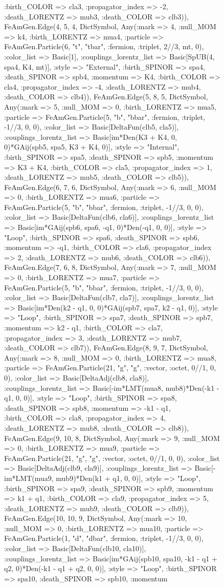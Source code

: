 \documentclass{revtex4}
\begin{document}
\begin{figure}[!htb]
\begin{center}
{:birth_COLOR => cla3, :propagator_index => -2, :death_LORENTZ => mub3, :death_COLOR => clb3)), FeAmGen.Edge(4, 5, 4, Dict{Symbol, Any}(:mark => 4, :null_MOM => k4, :birth_LORENTZ => mua4, :particle => FeAmGen.Particle(6, "t", "tbar", :fermion, :triplet, 2//3, mt, 0), :color_list => Basic[1], :couplings_lorentz_list => Basic[SpUB(4, spa4, K4, mt)], :style => "External", :birth_SPINOR => spa4, :death_SPINOR => spb4, :momentum => K4, :birth_COLOR => cla4, :propagator_index => -4, :death_LORENTZ => mub4, :death_COLOR => clb4)), FeAmGen.Edge(5, 8, 5, Dict{Symbol, Any}(:mark => 5, :null_MOM => 0, :birth_LORENTZ => mua5, :particle => FeAmGen.Particle(5, "b", "bbar", :fermion, :triplet, -1//3, 0, 0), :color_list => Basic[DeltaFun(clb5, cla5)], :couplings_lorentz_list => Basic[im*Den(K3 + K4, 0, 0)*GAij(spb5, spa5, K3 + K4, 0)], :style => "Internal", :birth_SPINOR => spa5, :death_SPINOR => spb5, :momentum => K3 + K4, :birth_COLOR => cla5, :propagator_index => 1, :death_LORENTZ => mub5, :death_COLOR => clb5)), FeAmGen.Edge(6, 7, 6, Dict{Symbol, Any}(:mark => 6, :null_MOM => 0, :birth_LORENTZ => mua6, :particle => FeAmGen.Particle(5, "b", "bbar", :fermion, :triplet, -1//3, 0, 0), :color_list => Basic[DeltaFun(clb6, cla6)], :couplings_lorentz_list => Basic[im*GAij(spb6, spa6, -q1, 0)*Den(-q1, 0, 0)], :style => "Loop", :birth_SPINOR => spa6, :death_SPINOR => spb6, :momentum => -q1, :birth_COLOR => cla6, :propagator_index => 2, :death_LORENTZ => mub6, :death_COLOR => clb6)), FeAmGen.Edge(7, 6, 8, Dict{Symbol, Any}(:mark => 7, :null_MOM => 0, :birth_LORENTZ => mua7, :particle => FeAmGen.Particle(5, "b", "bbar", :fermion, :triplet, -1//3, 0, 0), :color_list => Basic[DeltaFun(clb7, cla7)], :couplings_lorentz_list => Basic[im*Den(k2 - q1, 0, 0)*GAij(spb7, spa7, k2 - q1, 0)], :style => "Loop", :birth_SPINOR => spa7, :death_SPINOR => spb7, :momentum => k2 - q1, :birth_COLOR => cla7, :propagator_index => 3, :death_LORENTZ => mub7, :death_COLOR => clb7)), FeAmGen.Edge(8, 9, 7, Dict{Symbol, Any}(:mark => 8, :null_MOM => 0, :birth_LORENTZ => mua8, :particle => FeAmGen.Particle(21, "g", "g", :vector, :octet, 0//1, 0, 0), :color_list => Basic[DeltaAdj(clb8, cla8)], :couplings_lorentz_list => Basic[-im*LMT(mua8, mub8)*Den(-k1 - q1, 0, 0)], :style => "Loop", :birth_SPINOR => spa8, :death_SPINOR => spb8, :momentum => -k1 - q1, :birth_COLOR => cla8, :propagator_index => 4, :death_LORENTZ => mub8, :death_COLOR => clb8)), FeAmGen.Edge(9, 10, 8, Dict{Symbol, Any}(:mark => 9, :null_MOM => 0, :birth_LORENTZ => mua9, :particle => FeAmGen.Particle(21, "g", "g", :vector, :octet, 0//1, 0, 0), :color_list => Basic[DeltaAdj(clb9, cla9)], :couplings_lorentz_list => Basic[-im*LMT(mua9, mub9)*Den(k1 + q1, 0, 0)], :style => "Loop", :birth_SPINOR => spa9, :death_SPINOR => spb9, :momentum => k1 + q1, :birth_COLOR => cla9, :propagator_index => 5, :death_LORENTZ => mub9, :death_COLOR => clb9)), FeAmGen.Edge(10, 10, 9, Dict{Symbol, Any}(:mark => 10, :null_MOM => 0, :birth_LORENTZ => mua10, :particle => FeAmGen.Particle(1, "d", "dbar", :fermion, :triplet, -1//3, 0, 0), :color_list => Basic[DeltaFun(clb10, cla10)], :couplings_lorentz_list => Basic[im*GAij(spb10, spa10, -k1 - q1 + q2, 0)*Den(-k1 - q1 + q2, 0, 0)], :style => "Loop", :birth_SPINOR => spa10, :death_SPINOR => spb10, :momentum }
\end{center}
\end{figure}
\end{document}
